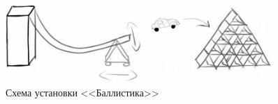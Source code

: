 \begin{figure}[h!]
  \begin{center}
    \includegraphics[width=0.9\textwidth]{authors/leybovich-fig1.png}
  \end{center}
  \caption{Схема установки <<Баллистика>>}
  \label{fig:leybovich-fig1}
\end{figure}
